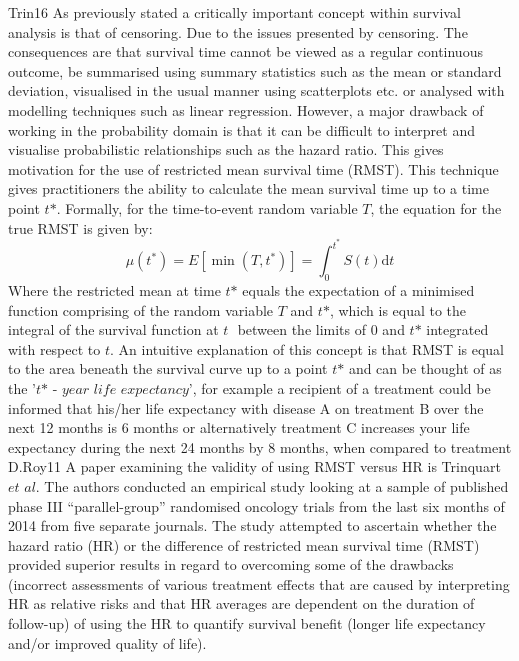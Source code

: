 \documentclass[12pt,twoside]{reedthesis}
\begin{document}
Trin16
As previously stated a critically important concept within survival analysis is that of censoring. Due to the issues presented by censoring. The consequences are that survival time cannot be viewed as a regular continuous outcome, be summarised using summary statistics such as the mean or standard deviation, visualised in the usual manner using scatterplots etc. or analysed with modelling techniques such as linear regression. However, a major drawback of working in the probability domain is that it can be difficult to interpret and visualise probabilistic relationships such as the hazard ratio.
This gives motivation for the use of restricted mean survival time (RMST). This technique gives practitioners the ability to calculate the mean survival time up to a time point \(\textit{t*}\). Formally, for the time-to-event random variable \(\textit{T}\), the equation for the true RMST is given by:
\[\mu\left(t^{*}\right)=E\left[\min \left(T, t^{*}\right)\right]=\int_{0}^{t^{*}} S(t) \mathrm{d} t\]
Where the restricted mean at time \(\textit{t*}\) equals the expectation of a minimised function comprising of the random variable \(\textit{T}\) and \(\textit{t*}\), which is equal to the integral of the survival function at \(\textit{t }\) between the limits of 0 and \(\textit{t*}\) integrated with respect to \(\textit{t}\). An intuitive explanation of this concept is that RMST is equal to the area beneath the survival curve up to a point \(\textit{t*}\) and can be thought of as the \(\textit{'t* - year life expectancy'}\), for example a recipient of a treatment could be informed that his/her life expectancy with disease A on treatment B over the next 12 months is 6 months or alternatively treatment C increases your life expectancy during the next 24 months by 8 months, when compared to treatment D.Roy11
A paper examining the validity of using RMST versus HR is Trinquart \(\textit{et al.}\) The authors conducted an empirical study looking at a sample of published phase III ``parallel-group'' randomised oncology trials from the last six months of 2014 from five separate journals.
The study attempted to ascertain whether the hazard ratio (HR) or the difference of restricted mean survival time (RMST) provided superior results in regard to overcoming some of the drawbacks (incorrect assessments of various treatment effects that are caused by interpreting HR as relative risks and that HR averages are dependent on the duration of follow-up) of using the HR to quantify survival benefit (longer life expectancy and/or improved quality of life).
\end{document}
